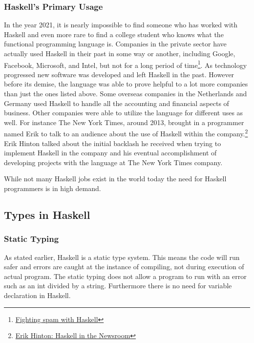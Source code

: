 \documentclass{article}
\begin{document}
        \subsubsection{Haskell's Primary Usage}
        In the year 2021, it is nearly impossible to find someone who has worked with Haskell and even more rare to find a college student who knows what the functional programming language is. Companies in the private sector have actually used Haskell in their past in some way or another, including Google, Facebook, Microsoft, and Intel, but not for a long period of time\footnote{\href{https://engineering.fb.com/2015/06/26/security/fighting-spam-with-haskell/}{Fighting spam with Haskell}}. As technology progressed new software was developed and left Haskell in the past. However before its demise, the language was able to prove helpful to a lot more companies than just the ones listed above. Some overseas companies in the Netherlands and Germany used Haskell to handle all the accounting and financial aspects of business. Other companies were able to utilize the language for different uses as well. For instance The New York Times, around 2013, brought in a programmer named Erik to talk to an audience about the use of Haskell within the company.\footnote{\href{https://www.infoq.com/presentations/haskell-newsroom-nyt/}{Erik Hinton: Haskell in the Newsroom}} Erik Hinton talked about the initial backlash he received when trying to implement Haskell in the company and his eventual accomplishment of developing projects with the language at The New York Times company.
        
        \medskip While not many Haskell jobs exist in the world today the need for Haskell programmers is in high demand. 

\subsection{Types in Haskell}

    \subsubsection{Static Typing}
    As stated earlier, Haskell is a static type system. This means the code will run safer and errors are caught at the instance of compiling, not during execution of actual program. The static typing does not allow a program to run with an error such as an int divided by a string. Furthermore there is no need for variable declaration in Haskell. 
    
\end{document}
